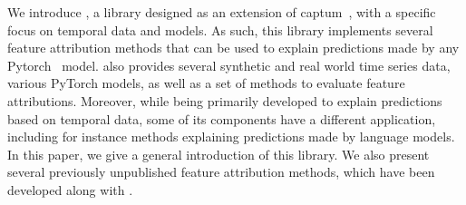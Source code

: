 We introduce \texttt{}, a library designed as an extension of
captum~\citep{kokhlikyan2020captum}, with a specific focus on temporal data and models.
As such, this library implements several feature attribution methods that can be used to explain predictions made by
any Pytorch~\citep{NEURIPS2019_9015} model.
\texttt{} also provides several synthetic and real world time series data, various PyTorch
models, as well as a set of methods to evaluate feature attributions.
Moreover, while being primarily developed to explain predictions based on temporal data, some of its components have a
different application, including for instance methods explaining predictions made by language models.
In this paper, we give a general introduction of this library.
We also present several previously unpublished feature attribution methods, which have been developed along with
\texttt{}.